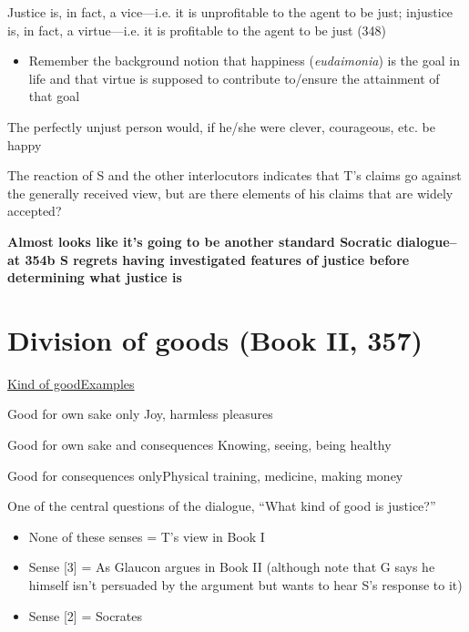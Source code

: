 \documentclass[11pt]{article}
\begin{document}
\noindent Justice is, in fact, a vice---i.e. it is unprofitable to the agent to be just; injustice is, in fact, a virtue---i.e. it is profitable to the agent to be just (348)

\begin{itemize}\item{Remember the background notion that happiness (\emph{eudaimonia}) is the goal in life and that virtue is supposed to contribute to/ensure the attainment of that goal}\end{itemize}

\noindent The perfectly unjust person would, if he/she were clever, courageous, etc. be happy
\vspace*{2mm}

\noindent The reaction of S and the other interlocutors indicates that T's claims go against the generally received view, but are there elements of his claims that are widely accepted?
\vspace*{2mm}

\noindent\textbf{Almost looks like it's going to be another standard Socratic dialogue--at 354b S regrets having investigated features of justice before determining what justice is}

\section*{Division of goods (Book II, 357)}

\noindent\underline{Kind of good}\hspace*{55mm}\underline{Examples}
\vspace*{2mm}

\noindent [1] Good for own sake only\hspace*{32mm} Joy, harmless pleasures

\noindent [2] Good for own sake and consequences\hspace*{11mm} Knowing, seeing, being healthy

\noindent [3] Good for consequences only\hspace*{26mm}Physical training, medicine, making money
\vspace*{2mm}

\noindent One of the central questions of the dialogue, ``What kind of good is justice?''
\begin{itemize}\item{None of these senses = T's view in Book I}\item{Sense [3] = As Glaucon argues in Book II (although note that G says he himself isn't persuaded by the argument but wants to hear S's response to it)}\item{Sense [2] = Socrates}\end{itemize}
\vspace*{-6mm}
\end{document}
